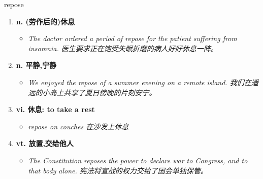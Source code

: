 
\begin{frame}
{\huge repose}
\begin{center}
\begin{enumerate}\Large
  \item \textbf{n. (劳作后的)休息}
  \begin{itemize}
    \item \em{\Large{The doctor ordered a period of repose for the patient suffering from insomnia. 医生要求正在饱受失眠折磨的病人好好休息一阵。}}
  \end{itemize}
  \item \textbf{n. 平静,宁静}
  \begin{itemize}
    \item \em{\Large{We enjoyed the repose of a summer evening on a remote island. 我们在遥远的小岛上共享了夏日傍晚的片刻安宁。}}
  \end{itemize}
  \item \textbf{vi. 休息: to take a rest}
  \begin{itemize}
    \item \em{\Large{repose on couches 在沙发上休息}}
  \end{itemize}
  \item \textbf{vt. 放置,交给他人}
  \begin{itemize}
    \item \em{\Large{The Constitution reposes the power to declare war to Congress, and to that body alone. 宪法将宣战的权力交给了国会单独保管。}}
  \end{itemize}
\end{enumerate}
\end{center}
\end{frame}
